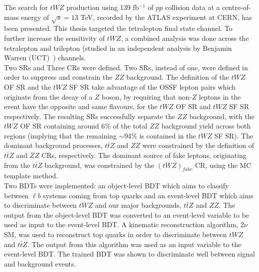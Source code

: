 


The search for $tWZ$ production using 139 fb$^{-1}$ of $pp$ collision data at a centre-of-mass energy of $\sqrt{s} = 13$ TeV, recorded by the ATLAS experiment at CERN, has been presented. This thesis targeted the tetralepton final state channel. To further increase the sensitivity of $tWZ$, a combined analysis was done across the tetralepton and trilepton (studied in an independent analysis by Benjamin Warren (UCT)~\cite{ben-thesis}) channels.\\

Two SRs and Three CRs were defined. Two SRs, instead of one, were defined in order to suppress and constrain the $ZZ$ background. The definition of the $tWZ$ OF SR and the $tWZ$ SF SR take advantage of the OSSF lepton pairs which originate from the decay of a $Z$ boson, by requiring that non-$Z$ leptons in the event have the opposite and same flavours, for the $tWZ$ OF SR and $tWZ$ SF SR respectively. The resulting SRs successfully separate the $ZZ$ background, with the $tWZ$ OF SR containing around 6$\%$ of the total $ZZ$ background yield across both regions (implying that the remaining $\sim$94$\%$ is contained in the $tWZ$ SF SR). The dominant background processes, $t\bar{t}Z $ and $ZZ$ were constrained by the definition of $t\bar{t}Z$ and $ZZ$ CRs, respectively. The dominant source of fake leptons, originating from the $t\bar{t}Z$ background, was constrained by the $(tWZ)_{fake}$ CR, using the MC template method.\\

Two BDTs were implemented: an object-level BDT which aims to classify between $\ell b$ systems coming from top quarks and an event-level BDT which aims to discriminate between $tWZ$ and our major backgrounds, $t\bar{t}Z$ and $ZZ$. The output from the object-level BDT was converted to an event-level variable to be used as input to the event-level BDT. A kinematic reconstruction algorithm, 2$\nu$SM, was used to reconstruct top quarks in order to discriminate between $tWZ$ and $t\bar{t}Z$. The output from this algorithm was used as an input variable to the event-level BDT. The trained BDT was shown to discriminate well between signal and background events.\\

